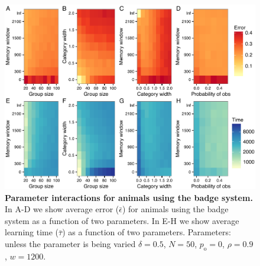 
\begin{figure}[ht]
\includegraphics[width=.8\textwidth]{figures/parameter_interactions_badge.pdf}
\caption{\sffamily\small\textbf{Parameter interactions for animals using the badge system.}
In A-D we show average error ($\bar{\epsilon}$) for animals using the badge system as a function of two parameters. In E-H we show average learning time ($\bar{\tau}$) as a function of two parameters. Parameters: unless the parameter is being varied $\delta = 0.5$, $N=50$, $p_\text{o}=0$, $\rho=0.9$, $w=1200$.}
\label{interactions_badge}
\end{figure}

